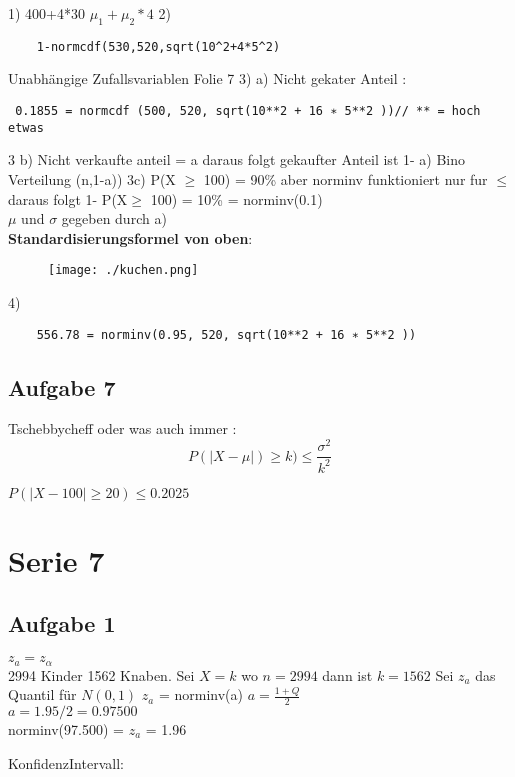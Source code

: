 \documentclass[a4paper,10pt]{scrbook}
\begin{document}
1) 400+4*30 $\mu_1 + \mu_2*4$
2) \begin{verbatim}
    1-normcdf(530,520,sqrt(10^2+4*5^2)
   \end{verbatim}
   Unabhängige Zufallsvariablen  Folie 7
3) a) Nicht gekater Anteil  : 
\begin{verbatim}
 0.1855 = normcdf (500, 520, sqrt(10**2 + 16 ∗ 5**2 ))// ** = hoch etwas
\end{verbatim}
3 b) Nicht verkaufte anteil = a daraus folgt gekaufter Anteil ist 1- a)
Bino Verteilung (n,1-a)) 
3c) P(X $\ge$ 100) = 90\% aber norminv funktioniert nur fur $\le$ daraus folgt  1- P(X$\ge$ 100) = 10\% = norminv(0.1)\\
$\mu $ und $\sigma$ gegeben durch a)\\
\textbf{Standardisierungsformel von oben}:
\begin{figure}[h]
 \centering
 \texttt{[image: ./kuchen.png]}
\end{figure}
4) \begin{verbatim}
    556.78 = norminv(0.95, 520, sqrt(10**2 + 16 ∗ 5**2 ))
   \end{verbatim}
\section*{Aufgabe 7}
\begin{framed}
 Tschebbycheff oder was auch immer :
 \begin{equation}
  P(|X - \mu|) \ge k) \le \frac{\sigma^2}{k^ 2}
 \end{equation}

\end{framed}
$ P(|X-100| \ge 20) \le 0.2025$

\chapter*{Serie 7}
\section*{Aufgabe 1}
$z_a = z_\alpha$\\
2994 Kinder 1562 Knaben.
Sei $X=k$ wo $n = 2994$ dann ist $k =1562$
Sei $z_a$ das Quantil für $N(0,1)$ $z_a$ = norminv(a) $ a = \frac{1 + Q}{2}$ \\
$ a = 1.95/2 = 0.97500$ \\
norminv(97.500) = $z_a$ = 1.96\\
\begin{framed}
KonfidenzIntervall:\\
 \begin{equation}
  [\frac{k}{n} - \frac{z_a}{n} \sqrt{\frac{k(n-k)}{n}},\frac{k}{n}+\frac{z_a}{n} \sqrt{\frac{k(n-k)}{n}}]
 \end{equation}

\end{framed}
\end{document}
